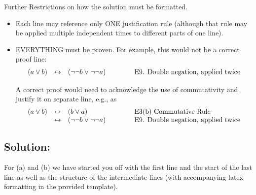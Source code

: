 \documentclass[12pt]{article}
\begin{document}
\bigskip

Further Restrictions on how the solution must be formatted.
\begin{itemize}
\item Each line may reference only ONE justification rule (although that rule may be applied multiple independent times to different parts of one line).
\item EVERYTHING must be proven.  For example, this would not be  a correct proof line:
$$
\begin{array}{lclcl}
    (a \vee b)  & \leftrightarrow &  (\neg \neg b \vee \neg \neg a) & \hspace*{.3in} & \mbox{E9. Double negation, applied twice}\\
  \end{array}
$$  

A correct proof would need to acknowledge the use of commutativity and justify it on separate line, e.g., as 
$$
\begin{array}{lclcl}
    (a \vee b)  & \leftrightarrow &  ( b \vee  a) & \hspace*{.3in} & \mbox{E3(b) Commutative Rule}\\
 & \leftrightarrow &  (\neg \neg b \vee \neg \neg a) & \hspace*{.3in} & \mbox{E9. Double negation, applied twice}\\
  \end{array}
$$  

\end{itemize}

\newpage
\subsection*{\textbf{Solution:}}

For (a) and (b) we have started you off with the first line and the start of the last line as well as the structure of the intermediate lines (with accompanying latex formatting in the provided template).
\end{document}

